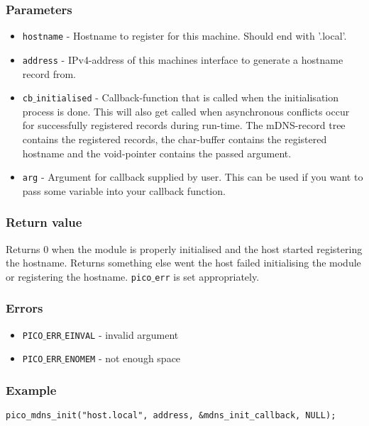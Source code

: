 \subsubsection*{Parameters}
\begin{itemize}[noitemsep]
\item \texttt{hostname} - Hostname to register for this machine. Should end with '.local'.
\item \texttt{address} - IPv4-address of this machines interface to generate a hostname record from.
\item \texttt{cb$\_$initialised} - Callback-function that is called when the initialisation process is done. This will also get called when asynchronous conflicts occur for successfully registered records during run-time. The mDNS-record tree contains the registered records, the char-buffer contains the registered hostname and the void-pointer contains the passed argument.
\item \texttt{arg} - Argument for callback supplied by user. This can be used if you want to pass some variable into your callback function.
\end{itemize}

\subsubsection*{Return value}
Returns 0 when the module is properly initialised and the host started registering the hostname. Returns something else went the host failed initialising the module or registering the hostname. \texttt{pico$\_$err} is set appropriately.

\subsubsection*{Errors}
\begin{itemize}[noitemsep]
\item \texttt{PICO$\_$ERR$\_$EINVAL} - invalid argument
\item \texttt{PICO$\_$ERR$\_$ENOMEM} - not enough space
\end{itemize}

\subsubsection*{Example}
\begin{verbatim}
pico_mdns_init("host.local", address, &mdns_init_callback, NULL);
\end{verbatim}


